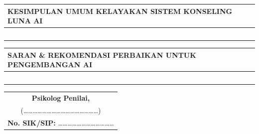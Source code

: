 \documentclass[11pt,a4paper]{article}
\begin{document}
\begin{table}[H]
\centering
\small
\begin{tabular}{|p{15.8cm}|}
\hline
\rowcolor{LunaTableHead}
\textbf{\color{LunaDarkText} KESIMPULAN UMUM KELAYAKAN SISTEM KONSELING LUNA AI} \\ \hline
\rule{0pt}{4.5cm} ~ \newline
~ \newline
~ \newline
~ \newline
~ \\ \hline
\end{tabular}
\end{table}

\begin{table}[H]
\centering
\small
\begin{tabular}{|p{15.8cm}|}
\hline
\rowcolor{LunaTableHead}
\textbf{\color{LunaDarkText} SARAN \& REKOMENDASI PERBAIKAN UNTUK PENGEMBANGAN AI} \\ \hline
\rule{0pt}{4.5cm} ~ \newline
~ \newline
~ \newline
~ \newline
~ \\ \hline
\end{tabular}
\end{table}

\vspace{0.6cm}

\begin{raggedleft}
\small
\begin{tabular}{c}
\textbf{Psikolog Penilai,} \\[3.0cm]
(\dots\dots\dots\dots\dots\dots\dots\dots\dots\dots\dots\dots\dots\dots\dots\dots) \\
\textbf{No. SIK/SIP:} \dots\dots\dots\dots\dots\dots\dots\dots\dots\dots\dots\dots
\end{tabular}
\end{raggedleft}
\end{document}
